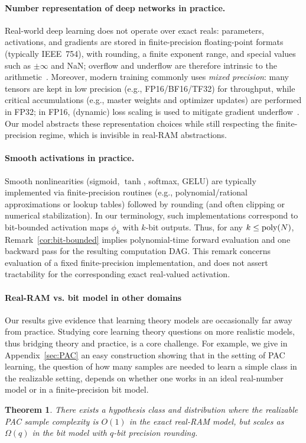 \documentclass{article}
\newcommand{\poly}{\textnormal{poly}}
\theoremstyle{plain}
\newtheorem{theorem}{Theorem}[section]
\theoremstyle{definition}
\theoremstyle{remark}
\begin{document}
\paragraph{Number representation of deep networks in practice.}
Real-world deep learning does not operate over exact reals: parameters, activations,
and gradients are stored in finite-precision floating-point formats (typically IEEE~754),
with rounding, a finite exponent range, and special values such as $\pm\infty$ and NaN;
overflow and underflow are therefore intrinsic to the arithmetic~\cite{ieee7542019}.
Moreover, modern training commonly uses \emph{mixed precision}: many tensors are kept in
low precision (e.g., FP16/BF16/TF32) for throughput, while critical accumulations
(e.g., master weights and optimizer updates) are performed in FP32; in FP16, (dynamic)
loss scaling is used to mitigate gradient underflow~\cite{micikevicius2017mixed,kalamkar2019bfloat16,nvidia_a100_2020}.
Our model abstracts these representation choices while still respecting the finite-precision
regime, which is invisible in real-RAM abstractions.



\paragraph{Smooth activations in practice.}
Smooth nonlinearities (sigmoid, $\tanh$, softmax, GELU) are typically implemented via finite-precision routines
(e.g., polynomial/rational approximations or lookup tables) followed by rounding (and often clipping or numerical
stabilization). In our terminology, such implementations correspond to bit-bounded activation maps $\phi_k$ with
$k$-bit outputs. Thus, for any $k\le \poly(N)$, Remark~\ref{cor:bit-bounded} implies polynomial-time forward
evaluation and one backward pass for the resulting computation DAG. This remark concerns evaluation of a fixed
finite-precision implementation, and does not assert tractability for the corresponding exact real-valued
activation.


\paragraph*{Real-RAM vs. bit model in other domains}
Our results give evidence that learning theory models are occasionally far away from practice. Studying core learning theory questions on more realistic models, thus bridging theory and practice, is a core challenge. For example, we give in Appendix~\ref{sec:PAC} an easy construction showing that in the setting of PAC learning, the question of how many samples are needed to learn a simple class in the realizable setting, depends on whether one works in an ideal real-number model or in a finite-precision bit model. 
\begin{theorem}
	\label{thm:intro-pac}
	There exists a hypothesis class and distribution where the realizable PAC sample complexity is $O(1)$ in the exact \textnormal{real-RAM} model, but scales as $\Omega(q)$ in the bit model with $q$-bit precision rounding.
\end{theorem}
\end{document}
